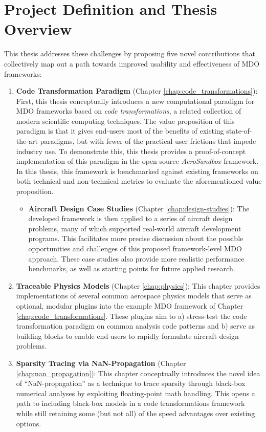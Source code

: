 \section{Project Definition and Thesis Overview}
\label{sec:definition}

This thesis addresses these challenges by proposing five novel contributions that collectively map out a path towards improved usability and effectiveness of MDO frameworks:

\begin{enumerate}
    \item \textbf{Code Transformation Paradigm} (Chapter \ref{chap:code_transformations}): First, this thesis conceptually introduces a new computational paradigm for MDO frameworks based on \emph{code transformations}, a related collection of modern scientific computing techniques. The value proposition of this paradigm is that it gives end-users most of the benefits of existing state-of-the-art paradigms, but with fewer of the practical user frictions that impede industry use. To demonstrate this, this thesis provides a proof-of-concept implementation of this paradigm in the open-source \textit{AeroSandbox} \cite{asb_github, sharpe_aerosandbox_2021} framework. In this thesis, this framework is benchmarked against existing frameworks on both technical and non-technical metrics to evaluate the aforementioned value proposition.
    \begin{itemize}
    \item \textbf{Aircraft Design Case Studies} (Chapter \ref{chap:design-studies}): The developed framework is then applied to a series of aircraft design problems, many of which supported real-world aircraft development programs. This facilitates more precise discussion about the possible opportunities and challenges of this proposed framework-level MDO approach. These case studies also provide more realistic performance benchmarks, as well as starting points for future applied research.
    \end{itemize}
    \item \textbf{Traceable Physics Models} (Chapter \ref{chap:physics}): This chapter provides implementations of several common aerospace physics models that serve as optional, modular plugins into the example MDO framework of Chapter \ref{chap:code_transformations}. These plugins aim to a) stress-test the code transformation paradigm on common analysis code patterns and b) serve as building blocks to enable end-users to rapidly formulate aircraft design problems.
    \item \textbf{Sparsity Tracing via NaN-Propagation} (Chapter \ref{chap:nan_propagation}): This chapter conceptually introduces the novel idea of ``NaN-propagation'' as a technique to trace sparsity through black-box numerical analyses by exploiting floating-point math handling. This opens a path to including black-box models in a code transformations framework while still retaining some (but not all) of the speed advantages over existing options.

\end{enumerate}
